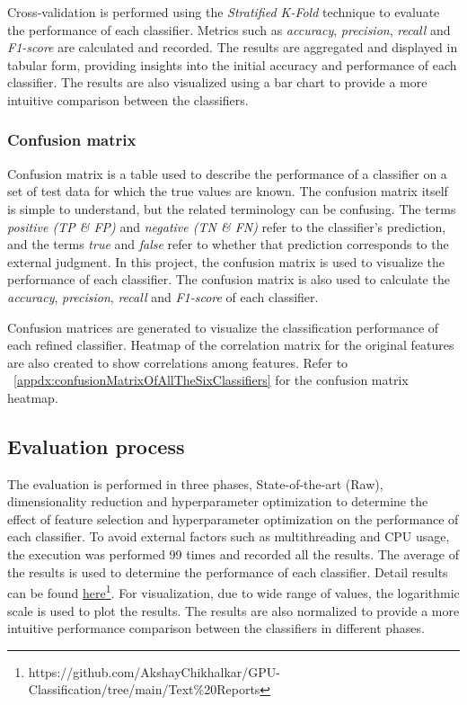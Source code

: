 		Cross-validation is performed using the \emph{Stratified K-Fold} technique to evaluate the performance of each classifier. Metrics such as \emph{accuracy}, \emph{precision}, \emph{recall} and \emph{F1-score} are calculated and recorded. The results are aggregated and displayed in tabular form, providing insights into the initial accuracy and performance of each classifier. The results are also visualized using a bar chart to provide a more intuitive comparison between the classifiers.

	\subsubsection{Confusion matrix}
		Confusion matrix is a table used to describe the performance of a classifier on a set of test data for which the true values are known. The confusion matrix itself is simple to understand, but the related terminology can be confusing. The terms \emph{positive (TP \& FP)} and \emph{negative (TN \& FN)} refer to the classifier's prediction, and the terms \emph{true} and \emph{false} refer to whether that prediction corresponds to the external judgment. In this project, the confusion matrix is used to visualize the performance of each classifier. The confusion matrix is also used to calculate the \emph{accuracy}, \emph{precision}, \emph{recall} and \emph{F1-score} of each classifier\cite{townsend1971theoretical}.

		Confusion matrices are generated to visualize the classification performance of each refined classifier. Heatmap of the correlation matrix for the original features are also created to show correlations among features. Refer to \appendixname~\ref{appdx:confusionMatrixOfAllTheSixClassifiers} for the confusion matrix heatmap. 

\subsection{Evaluation process}
	The evaluation is performed in three phases, State-of-the-art (Raw), dimensionality reduction and hyperparameter optimization to determine the effect of feature selection and hyperparameter optimization on the performance of each classifier. To avoid external factors such as multithreading and CPU usage, the execution was performed 99 times and recorded all the results. The average of the results is used to determine the performance of each classifier. Detail results can be found \href{https://github.com/AkshayChikhalkar/GPU-Classification/tree/main/Text%20Reports}{here}\footnote{https://github.com/AkshayChikhalkar/GPU-Classification/tree/main/Text\%20Reports}.
	For visualization, due to wide range of values, the logarithmic scale is used to plot the results. The results are also normalized to provide a more intuitive performance comparison between the classifiers in different phases.

